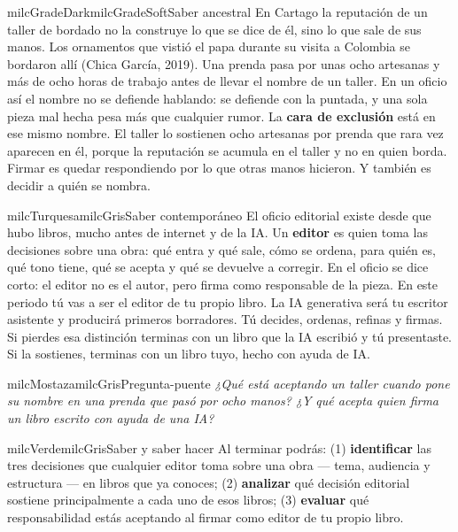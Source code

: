 \documentclass[11pt,letterpaper]{article}
\begin{document}
\begin{softbox}{milcGradeDark}{milcGradeSoft}{Saber ancestral}
En Cartago la reputación de un taller de bordado no la construye lo que se dice de él, sino lo que sale de sus manos. Los ornamentos que vistió el papa durante su visita a Colombia se bordaron allí (Chica García, 2019). Una prenda pasa por unas ocho artesanas y más de ocho horas de trabajo antes de llevar el nombre de un taller. En un oficio así el nombre no se defiende hablando: se defiende con la puntada, y una sola pieza mal hecha pesa más que cualquier rumor. La \textbf{cara de exclusión} está en ese mismo nombre. El taller lo sostienen ocho artesanas por prenda que rara vez aparecen en él, porque la reputación se acumula en el taller y no en quien borda. Firmar es quedar respondiendo por lo que otras manos hicieron. Y también es decidir a quién se nombra.\par{}
\end{softbox}

\begin{softbox}{milcTurquesa}{milcGris}{Saber contemporáneo}
El oficio editorial existe desde que hubo libros, mucho antes de internet y de la IA. Un \textbf{editor} es quien toma las decisiones sobre una obra: qué entra y qué sale, cómo se ordena, para quién es, qué tono tiene, qué se acepta y qué se devuelve a corregir. En el oficio se dice corto: el editor no es el autor, pero firma como responsable de la pieza. En este periodo tú vas a ser el editor de tu propio libro. La IA generativa será tu escritor asistente y producirá primeros borradores. Tú decides, ordenas, refinas y firmas. Si pierdes esa distinción terminas con un libro que la IA escribió y tú presentaste. Si la sostienes, terminas con un libro tuyo, hecho con ayuda de IA.
\end{softbox}

\begin{softbox}{milcMostaza}{milcGris}{Pregunta-puente}
\textit{¿Qué está aceptando un taller cuando pone su nombre en una prenda que pasó por ocho manos? ¿Y qué acepta quien firma un libro escrito con ayuda de una IA?}
\end{softbox}

\begin{softbox}{milcVerde}{milcGris}{Saber y saber hacer}
Al terminar podrás: (1) \textbf{identificar} las tres decisiones que cualquier editor toma sobre una obra --- tema, audiencia y estructura --- en libros que ya conoces; (2) \textbf{analizar} qué decisión editorial sostiene principalmente a cada uno de esos libros; (3) \textbf{evaluar} qué responsabilidad estás aceptando al firmar como editor de tu propio libro.
\end{softbox}
\end{document}
